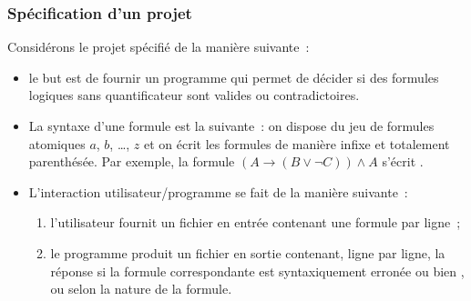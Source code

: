 \begin{frame}[fragile]
\frametitle{Spécification d'un projet}
Considérons le \alert{projet spécifié} de la manière suivante~:
\medskip

\begin{itemize}
    \item le but est de fournir un programme qui permet de décider si des
    formules logiques sans quantificateur sont valides ou contradictoires.
    \medskip

    \item La syntaxe d'une formule est la suivante~: on dispose
    du jeu de formules atomiques $a$, $b$, \dots, $z$ et on écrit les
    formules de manière infixe et totalement parenthésée.
    Par exemple, la formule $(A \to (B \vee \neg C)) \wedge A$ s'écrit
    .
    \medskip

    \item L'interaction utilisateur/programme se fait de la manière
    suivante~:
    \begin{enumerate} \normalsize
        \item l'utilisateur fournit un fichier en entrée contenant une
        formule par ligne~;
        \smallskip

        \item le programme produit un fichier en sortie contenant, ligne
        par ligne, la réponse  si la formule correspondante
        est syntaxiquement erronée ou bien ,
         ou  selon la nature de la
        formule.
    \end{enumerate}
\end{itemize}
\end{frame}

